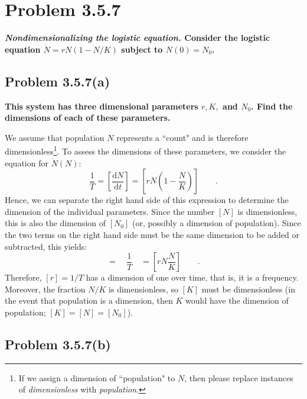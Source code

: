 \documentclass[draft]{agujournal2019}
\begin{document}
 

\section{Problem 3.5.7}
\label{sec:p7}

\textbf{\textit{Nondimensionalizing the logistic equation.} Consider the logistic equation $\dot N = r N (1 - N/K) $ subject to $N(0)=N_0$.} 






\subsection{Problem 3.5.7(a)}
\label{ssec:p7a}

\textbf{This system has three dimensional parameters $r, K,$ and $N_0$. Find the dimensions of each of these parameters. }

We assume that population $N$ represents a ``count" and is therefore dimensionless\footnote{If we assign a dimension of ``population" to $N$, then please replace instances of \emph{dimensionless} with \emph{population}.}. To assess the dimensions of these parameters, we consider the equation for $\dot{N}(N)$:
\begin{equation*}
    \frac{1}{T} = \left[\frac{\mathrm{d}N}{\mathrm{d}t}\right] = \left[ rN \left(1 - \frac{N}{K}\right) \right] \qquad .
\end{equation*}
Hence, we can separate the right hand side of this expression to determine the dimension of the individual parameters. Since the number $[N]$ is dimensionless, this is also the dimension of $[N_0]$ (or, possibly a dimension of population). 
Since the two terms on the right hand side must be the same dimension to be added or subtracted, this yields:
\begin{equation*}
    [rN] = \quad \frac{1}{T} \quad= \left[rN\frac{N}{K}\right] \qquad .
\end{equation*}
Therefore, $[r]=1/T$ has a dimension of one over time, that is, it is a frequency. Moreover, the fraction $N/K$ is dimensionless, so $[K]$ must be dimensionless (in the event that population is a dimension, then $K$ would have the dimension of population; $[K]=[N]=[N_0]$).  


\subsection{Problem 3.5.7(b)}
\label{ssec:p7b}
\end{document}
